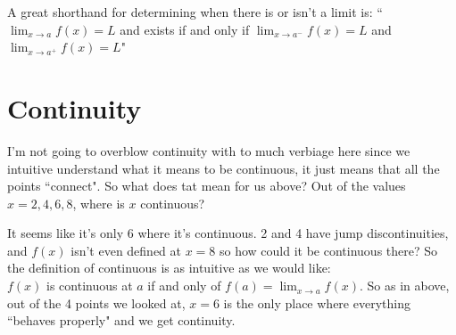 \documentclass[10pt]{article}
\theoremstyle{definition}
\newcommand{\limit}[2]{\displaystyle{ \lim_{#1 \to #2}}}
\begin{document}
A great shorthand for determining when there is or isn't a limit is: ``$\limit{x}{a}f(x)=L$ and exists if and only if $\limit{x}{a^-}f(x)=L$ and $\limit{x}{a^+}f(x)=L$"

\section{Continuity}

I'm not going to overblow continuity with to much verbiage here since we intuitive understand what it means to be continuous, it just means that all the points ``connect".  So what does tat mean for us above?  Out of the values $x=2,4,6,8$, where is $x$ continuous?

It seems like it's only 6 where it's continuous.  2 and 4 have jump discontinuities, and $f(x)$ isn't even defined at $x=8$ so how could it be continuous there?  So the definition of continuous is as intuitive as we would like:\\

$f(x)$ is continuous at $a$ if and only of $f(a)=\limit{x}{a} f(x)$.  So as in above, out of the 4 points we looked at, $x=6$ is the only place where everything ``behaves properly" and we get continuity.
\end{document}
